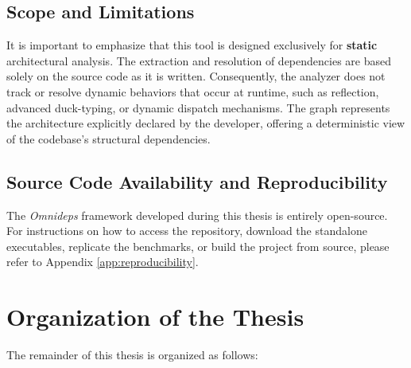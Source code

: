\subsection{Scope and Limitations}
It is important to emphasize that this tool is designed exclusively
for \textbf{static} architectural analysis. The extraction and
resolution of dependencies are based solely on the source code as it
is written. Consequently, the analyzer does not track or resolve
dynamic behaviors that occur at runtime, such as reflection, advanced
duck-typing, or dynamic dispatch mechanisms. The graph represents the
architecture explicitly declared by the developer, offering a
deterministic view of the codebase's structural dependencies.

\subsection{Source Code Availability and Reproducibility}
The \textit{Omnideps} framework developed during this thesis is
entirely open-source. For instructions on how to access the
repository, download the standalone executables, replicate the
benchmarks, or build the project from source, please refer to
Appendix \ref{app:reproducibility}.

\section{Organization of the Thesis}

The remainder of this thesis is organized as follows:

